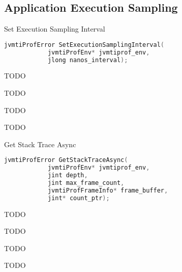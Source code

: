 \subsection{Application Execution Sampling}

\begin{apidef}{Set Execution Sampling Interval}
\begin{lstlisting}[language=C]
jvmtiProfError SetExecutionSamplingInterval(
            jvmtiProfEnv* jvmtiprof_env,
            jlong nanos_interval);
\end{lstlisting}

\begin{apidesc}
TODO
\end{apidesc}

\begin{apiphase}
TODO
\end{apiphase}

\begin{apicap}
TODO
\end{apicap}

\begin{apiparam}
\end{apiparam}

\begin{apireturn}
TODO
\end{apireturn}

\begin{apierror}
\end{apierror}
\end{apidef}
\begin{apidef}{Get Stack Trace Async}
\begin{lstlisting}[language=C]
jvmtiProfError GetStackTraceAsync(
            jvmtiProfEnv* jvmtiprof_env,
            jint depth,
            jint max_frame_count,
            jvmtiProfFrameInfo* frame_buffer,
            jint* count_ptr);
\end{lstlisting}

\begin{apidesc}
TODO
\end{apidesc}

\begin{apiphase}
TODO
\end{apiphase}

\begin{apicap}
TODO
\end{apicap}

\begin{apiparam}
\end{apiparam}

\begin{apireturn}
TODO
\end{apireturn}

\begin{apierror}
\end{apierror}
\end{apidef}

